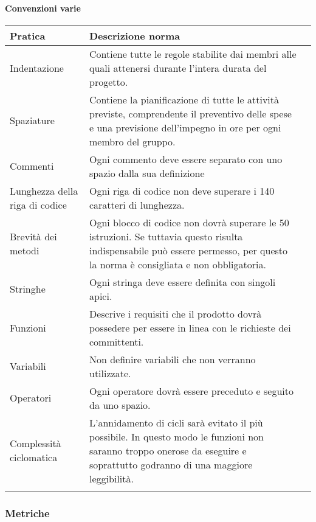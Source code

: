 \paragraph{Convenzioni varie}

{
	\setlength{\freewidth}{\dimexpr\textwidth-0\tabcolsep}
	\renewcommand{\arraystretch}{1.5}
	\setlength{\aboverulesep}{0pt}
	\setlength{\belowrulesep}{0pt}
	\begin{longtable}{L{.210\freewidth} L{.6\freewidth} L{.080\freewidth}}
		\toprule 
		\textbf{Pratica} & \textbf{Descrizione norma} \\
		\toprule
		\endhead		
		Indentazione & Contiene tutte le regole stabilite dai membri alle quali attenersi durante l'intera durata del progetto. \\ 
		Spaziature & Contiene la pianificazione di tutte le attività previste, comprendente il preventivo delle spese e una previsione dell'impegno in ore per ogni membro del gruppo.  \\
		Commenti & Ogni commento deve essere separato con uno spazio dalla sua definizione \\ 
		Lunghezza della riga di codice & Ogni riga di codice non deve superare i 140 caratteri di lunghezza. \\
		Brevità dei metodi & Ogni blocco di codice non dovrà superare le 50 istruzioni. Se tuttavia questo risulta indispensabile può essere permesso, per questo la norma è consigliata e non obbligatoria.\\ 	
		Stringhe & Ogni stringa deve essere definita con singoli apici. \\
		Funzioni & Descrive i requisiti che il prodotto dovrà possedere per essere in linea con le richieste dei committenti.\\ 	
		Variabili & Non definire variabili che non verranno utilizzate.\\ 	
		Operatori & Ogni operatore dovrà essere preceduto e seguito da uno spazio.\\ 	
		Complessità ciclomatica & L'annidamento di cicli sarà evitato il più possibile. In questo modo le funzioni non saranno troppo onerose da eseguire e soprattutto godranno di una maggiore leggibilità. \\  			
		\bottomrule
		\hiderowcolors
	\end{longtable}
}



\subsubsection{Metriche}

